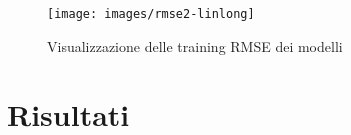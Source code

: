 \begin{figure}[H]
	\centering
	{\texttt{[image: images/rmse2-linlong]}} 
	\caption{Visualizzazione delle training RMSE dei modelli}
	\label{fig:rmse}
\end{figure}



\section{Risultati}
\label{sec:risultati}






